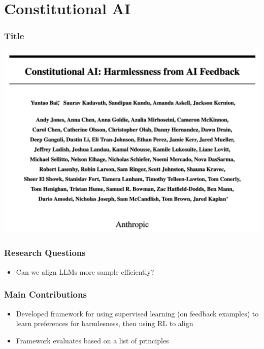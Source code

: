 \documentclass[xcolor=dvipsnames]{beamer}
\newcommand{\0}{\vec{0}}
\begin{document}
\section{Constitutional AI}
\begin{frame}
	\frametitle{Title}
	\begin{center}
		\includegraphics[width=\textwidth]{Bai0}
	\end{center}
\end{frame}

\begin{frame}
	\frametitle{Research Questions
	}
	\begin{itemize}
		\item Can we align LLMs more sample efficiently?
	\end{itemize}
\end{frame}

\begin{frame}
	\frametitle{Main Contributions
	}
	\begin{itemize}
		\item Developed framework for using supervised learning (on feedback examples) to learn preferences for harmlesness, then using RL to align
		\item Framework evaluates based on a list of principles
	\end{itemize}
\end{frame}





	
\end{document}
